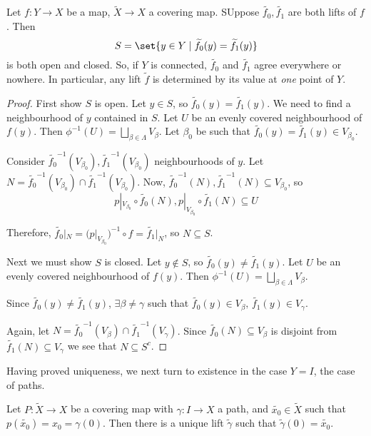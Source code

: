\documentclass{article}
\numberwithin{nthm}{subsection}
\begin{document}
\begin{lemma}
    Let $f: Y \to X$ be a map, $\widetilde{X} \to X$ a covering map. SUppose $\widetilde{f_0}, \widetilde{f_1}$ are both lifts of $f$. Then
    \begin{equation*}
        S = \set{y \in Y \mid \widetilde{f_0}(y) = \widetilde{f_1}(y)}
    \end{equation*}
    is both open and closed. So, if $Y$ is connected, $\widetilde{f_0}$ and $\widetilde{f_1}$ agree everywhere or nowhere. In particular, any lift $\widetilde{f}$ is determined by its value at \emph{one} point of $Y$.
\end{lemma}

\begin{proof}
    First show $S$ is open. Let $y \in S$, so $\widetilde{f_0}(y) = \widetilde{f_1}(y)$.
    We need to find a neighbourhood of $y$ contained in $S$.
    Let $U$ be an evenly covered neighbourhood of $f(y)$.
    Then $\phi^{-1}(U) = \bigsqcup_{\beta \in \Lambda} V_\beta$.
    Let $\beta_0$ be such that $\widetilde{f_0}(y) = \widetilde{f_1}(y) \in V_{\beta_0}$.

    Consider $\widetilde{f_0}^{-1}(V_{\beta_0}), \widetilde{f_1}^{-1}(V_{\beta_0})$ neighbourhoods of $y$.
    Let $N = \widetilde{f_0}^{-1}(V_{\beta_0}) \cap \widetilde{f_1}^{-1}(V_{\beta_0})$.
    Now, $\widetilde{f_0}^{-1}(N), \widetilde{f_1}^{-1}(N) \subseteq V_{\beta_0}$, so
    \begin{equation*}
        p |_{V_{\beta_0}} \circ \widetilde{f_0}(N), p |_{V_{\beta_0}} \circ \widetilde{f_1}(N) \subseteq U
    \end{equation*}

    Therefore, $\widetilde{f_0}|_N = (p |_{V_{\beta_0}})^{-1} \circ f = \widetilde{f_1}|_N$, so $N \subseteq S$.


    Next we must show $S$ is closed.  Let $y \notin S$, so $\widetilde{f_0}(y) \neq \widetilde{f_1}(y)$.
    Let $U$ be an evenly covered neighbourhood of $f(y)$.
    Then $\phi^{-1}(U) = \bigsqcup_{\beta \in \Lambda} V_\beta$.

    Since $\widetilde{f_0}(y) \neq \widetilde{f_1}(y)$, $\exists \beta \neq \gamma$ such that $\widetilde{f_0}(y) \in V_{\beta}, \, \widetilde{f_1}(y) \in V_{\gamma}$.

    Again, let $N = \widetilde{f_0}^{-1}(V_{\beta}) \cap \widetilde{f_1}^{-1}(V_{\gamma})$.
    Since $\widetilde{f_0}(N) \subseteq V_\beta$ is disjoint from $\widetilde{f_1}(N) \subseteq V_\gamma$ we see that $N \subseteq S^c$.
\end{proof}

Having proved uniqueness, we next turn to existence in the case $Y = I$, the case of paths.

\begin{lemma}
    Let $P: \widetilde{X} \to X$ be a covering map with $\gamma:I \to X$ a path, and $\widetilde{x_0} \in \widetilde{X}$ such that $p(\widetilde{x_0}) = x_0 = \gamma(0)$.
    Then there is a unique lift $\widetilde{\gamma}$ such that $\widetilde{\gamma}(0) = \widetilde{x_0}$.
\end{lemma}
\end{document}
